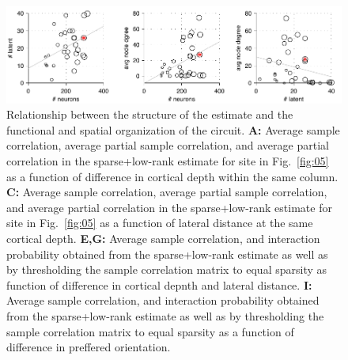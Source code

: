 \begin{figure}[htp]
\centering
\includegraphics{figures/Summary.pdf}
\caption{
Relationship between the structure of the estimate and the functional and spatial organization of the circuit.
{\bf A:} Average sample correlation, average partial sample correlation, and average partial correlation in the sparse+low-rank estimate for site in Fig.~\ref{fig:05} as a function of difference in cortical depth within the same column.
{\bf C:} Average sample correlation, average partial sample correlation, and average partial correlation in the sparse+low-rank estimate for site in Fig.~\ref{fig:05} as a function of lateral distance at the same cortical depth.
{\bf E,G:} Average sample correlation, and interaction probability obtained from the sparse+low-rank estimate as well as by thresholding the sample correlation matrix to equal sparsity as function of difference in cortical depnth and lateral distance.
{\bf I:} Average sample correlation, and interaction probability obtained from the sparse+low-rank estimate as well as by thresholding the sample correlation matrix to equal sparsity as a function of difference in preffered orientation.
}
\label{fig:06}
\end{figure}
